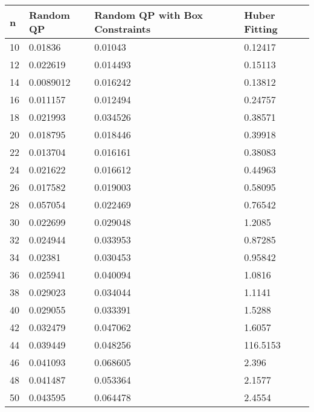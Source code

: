 \begin{tabular}{llll}
n & Random QP & Random QP with Box Constraints & Huber Fitting \\ 
\hline 
10 & 0.01836 & 0.01043 & 0.12417 \\ 
12 & 0.022619 & 0.014493 & 0.15113 \\ 
14 & 0.0089012 & 0.016242 & 0.13812 \\ 
16 & 0.011157 & 0.012494 & 0.24757 \\ 
18 & 0.021993 & 0.034526 & 0.38571 \\ 
20 & 0.018795 & 0.018446 & 0.39918 \\ 
22 & 0.013704 & 0.016161 & 0.38083 \\ 
24 & 0.021622 & 0.016612 & 0.44963 \\ 
26 & 0.017582 & 0.019003 & 0.58095 \\ 
28 & 0.057054 & 0.022469 & 0.76542 \\ 
30 & 0.022699 & 0.029048 & 1.2085 \\ 
32 & 0.024944 & 0.033953 & 0.87285 \\ 
34 & 0.02381 & 0.030453 & 0.95842 \\ 
36 & 0.025941 & 0.040094 & 1.0816 \\ 
38 & 0.029023 & 0.034044 & 1.1141 \\ 
40 & 0.029055 & 0.033391 & 1.5288 \\ 
42 & 0.032479 & 0.047062 & 1.6057 \\ 
44 & 0.039449 & 0.048256 & 116.5153 \\ 
46 & 0.041093 & 0.068605 & 2.396 \\ 
48 & 0.041487 & 0.053364 & 2.1577 \\ 
50 & 0.043595 & 0.064478 & 2.4554 \\ 
\hline 
\end{tabular}